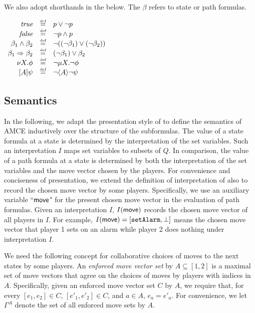 \documentclass[times,10pt,twocolumn]{article}
\newcommand{\true}{\mbox{\em true}}
\newcommand{\false}{\mbox{\em false}}
\newcommand{\move}{\ensuremath{\sf move}}
\newcommand{\defn}{\stackrel{\mbox{\tiny def}}{=}}
\begin{document}
We also adopt shorthands in the below.  
The $\beta$ refers to state or path formulas.
\begin{center} 
$\begin{array}{rcl}
\true	& \defn & p \vee \neg p \\
\false	& \defn	& \neg p \wedge p \\ 

\beta_1 \wedge \beta_2 & \defn & \neg((\neg \beta_1) \vee (\neg \beta_2)) \\ 
\beta_1 \Rightarrow \beta_2 & \defn & (\neg \beta_1) \vee \beta_2 \\

\nu X.\phi & \defn & \neg \mu X.\neg\phi \\ 

{[A]\psi} & \defn & \neg \langle A\rangle \neg\psi \\ 
\end{array}$
\end{center} 





\subsection{Semantics \label{sec.amc.semantics}} 

In the following, we adapt the presentation style of \cite{AHK02} 
to define the semantics of AMCE inductively over the structure of the subformulas.  
The value of a state formula at a state \label{reply1.semantics.dont.understand} 
is determined by the interpretation of the set variables.  
Such an interpretation $I$ maps set variables to subsets of $Q$.  
In comparison, the value of a path formula at a state 
is determined by both the interpretation
of the set variables and the move vector chosen by the players. 
For convenience and conciseness of presentation, 
we extend the definition of interpretation of \cite{AHK02} also to 
record the chosen move vector by some players. 
Specifically, we use an auxiliary variable ``$\move$"  
for the present chosen move vector in the evaluation of path formulas. 
Given an interpretation $I$, $I(\move)$ records the chosen move vector  
of all players in $I$.  
For example, $I(\move)=[\text{\tt setAlarm},\perp]$ 
means the chosen move vector 
that player 1 sets on an alarm while player 2 does nothing under interpretation $I$. 

We need the following concept for collaborative choices of moves 
to the next states by some players. 
An {\em enforced move vector set} by $A\subseteq [1,2]$ is 
a maximal set of move vectors that agree on the choices of moves 
by players with indices in $A$. 
Specifically, given an enforced move vector set $C$ by $A$, 
we require that, for every $[e_1,e_2]\in C$,  
$[e'_1,e'_2]\in C$, and $a\in A$, $e_a=e'_a$.  
For convenience, we let $\Gamma^A$ denote the set of all 
enforced move sets by $A$.  
\end{document}
